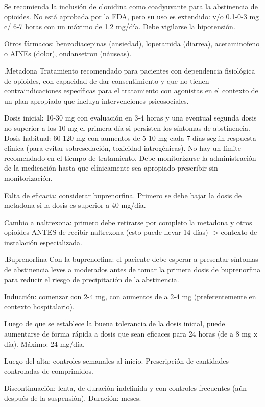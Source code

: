 \documentclass{scrbook}
\begin{document}
Se recomienda la inclusión de clonidina como coadyuvante para la abstinencia de opioides. No está aprobada por la FDA, pero su uso es extendido: v/o 0.1-0-3 mg c/ 6-7 horas con un máximo de 1.2 mg/día. Debe vigilarse la hipotensión.

Otros fármacos: benzodiacepinas (ansiedad), loperamida (diarrea), acetaminofeno o AINEs (dolor), ondansetron (náuseas).

.Metadona
Tratamiento recomendado para pacientes con dependencia fisiológica de opioides, con capacidad de dar consentimiento y que no tienen contraindicaciones específicas para el tratamiento con agonistas en el contexto de un plan apropiado que incluya intervenciones psicosociales.

Dosis inicial: 10-30 mg con evaluación en 3-4 horas y una eventual segunda dosis no superior a los 10 mg el primera día si persisten los síntomas de abstinencia.
Dosis habitual: 60-120 mg con aumentos de 5-10 mg cada 7 días según respuesta clínica (para evitar sobresedación, toxicidad iatrogénicas). No hay un límite recomendado en el tiempo de tratamiento.
Debe monitorizarse la administración de la medicación hasta que clínicamente sea apropiado prescribir sin monitorización.

Falta de eficacia: considerar buprenorfina. Primero se debe bajar la dosis de metadona si la dosis es superior a 40 mg/día.

Cambio a naltrexona: primero debe retirarse por completo la metadona y otros opioides ANTES de recibir naltrexona (esto puede llevar 14 días) -> contexto de instalación especializada.


.Buprenorfina
Con la buprenorfina: el paciente debe esperar a presentar síntomas de abstinencia leves a moderados antes de tomar la primera dosis de buprenorfina para reducir el riesgo de precipitación de la abstinencia.

Inducción: comenzar con 2-4 mg, con aumentos de a 2-4 mg (preferentemente en contexto hospitalario).

Luego de que se establece la buena tolerancia de la dosis inicial, puede aumentarse de forma rápida a dosis que sean eficaces para 24 horas (de a 8 mg x día). Máximo: 24 mg/día.

Luego del alta: controles semanales al inicio. Prescripción de cantidades controladas de comprimidos.

Discontinuación: lenta, de duración indefinida y con controles frecuentes (aún después de la suspensión). Duración: meses.
\end{document}
